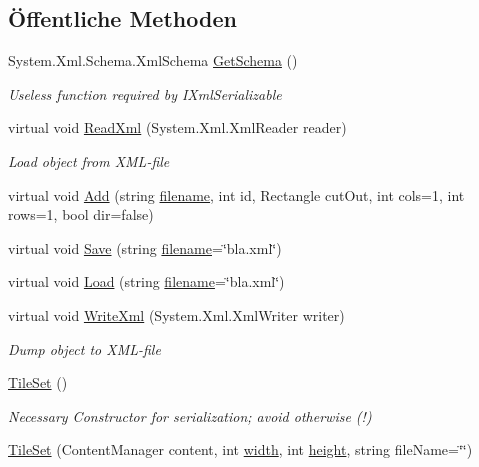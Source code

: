 \subsection*{Öffentliche Methoden}
\begin{DoxyCompactItemize}
\item 
System.\-Xml.\-Schema.\-Xml\-Schema \hyperlink{class_gruppe22_1_1_client_1_1_tile_set_a63b3c173c6c2ba51ee5c42d7c4c2d57f}{Get\-Schema} ()
\begin{DoxyCompactList}\small\item\em Useless function required by I\-Xml\-Serializable \end{DoxyCompactList}\item 
virtual void \hyperlink{class_gruppe22_1_1_client_1_1_tile_set_a7395745bf6ef4bf3374d4221cb86689f}{Read\-Xml} (System.\-Xml.\-Xml\-Reader reader)
\begin{DoxyCompactList}\small\item\em Load object from X\-M\-L-\/file \end{DoxyCompactList}\item 
virtual void \hyperlink{class_gruppe22_1_1_client_1_1_tile_set_a8c56d016cdc86ee439db9dc80f963017}{Add} (string \hyperlink{class_gruppe22_1_1_client_1_1_tile_set_afce49a3941b2d4a360990f9847282da1}{filename}, int id, Rectangle cut\-Out, int cols=1, int rows=1, bool dir=false)
\item 
virtual void \hyperlink{class_gruppe22_1_1_client_1_1_tile_set_aee5a346f67239555aabd55180b29c10f}{Save} (string \hyperlink{class_gruppe22_1_1_client_1_1_tile_set_afce49a3941b2d4a360990f9847282da1}{filename}=\char`\"{}bla.\-xml\char`\"{})
\item 
virtual void \hyperlink{class_gruppe22_1_1_client_1_1_tile_set_a9dd72fa07af2de21ab5c68e9d63c83f2}{Load} (string \hyperlink{class_gruppe22_1_1_client_1_1_tile_set_afce49a3941b2d4a360990f9847282da1}{filename}=\char`\"{}bla.\-xml\char`\"{})
\item 
virtual void \hyperlink{class_gruppe22_1_1_client_1_1_tile_set_a4a27a9d327257a79db59b2681daaa0c7}{Write\-Xml} (System.\-Xml.\-Xml\-Writer writer)
\begin{DoxyCompactList}\small\item\em Dump object to X\-M\-L-\/file \end{DoxyCompactList}\item 
\hyperlink{class_gruppe22_1_1_client_1_1_tile_set_ae752a75f57d5ddc17287c94df2c117e3}{Tile\-Set} ()
\begin{DoxyCompactList}\small\item\em Necessary Constructor for serialization; avoid otherwise (!) \end{DoxyCompactList}\item 
\hyperlink{class_gruppe22_1_1_client_1_1_tile_set_ae70a20fdd5b77a5e0b60308768c37a7e}{Tile\-Set} (Content\-Manager content, int \hyperlink{class_gruppe22_1_1_client_1_1_tile_set_aff0371f9e4071f24de16612c2066ad5b}{width}, int \hyperlink{class_gruppe22_1_1_client_1_1_tile_set_a12343c861014c3631e1a40dfeef20312}{height}, string file\-Name=\char`\"{}\char`\"{})
\end{DoxyCompactItemize}
